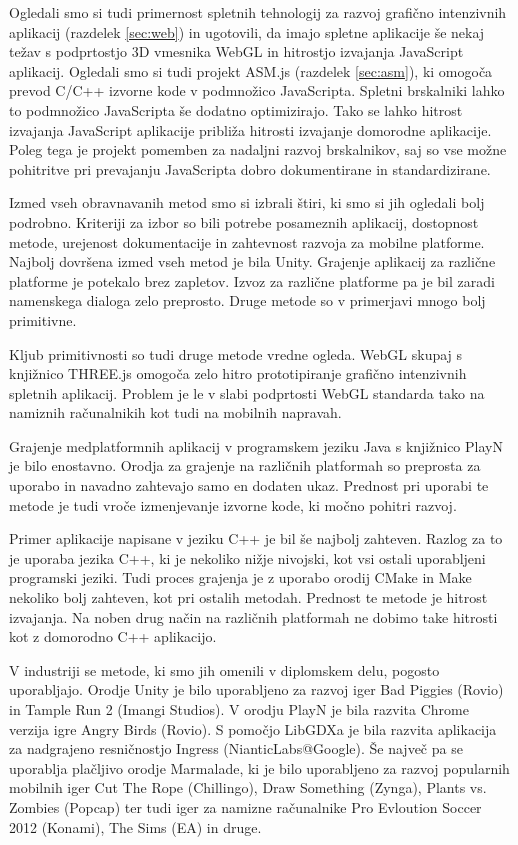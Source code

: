 Ogledali smo si tudi primernost spletnih tehnologij za razvoj grafično intenzivnih aplikacij (razdelek \ref{sec:web}) in ugotovili, da imajo spletne aplikacije še nekaj težav s podprtostjo 3D vmesnika WebGL in hitrostjo izvajanja JavaScript aplikacij. Ogledali smo si tudi projekt ASM.js (razdelek \ref{sec:asm}), ki omogoča prevod C/C++ izvorne kode v podmnožico JavaScripta. Spletni brskalniki lahko to podmnožico JavaScripta še dodatno optimizirajo. Tako se lahko hitrost izvajanja JavaScript aplikacije približa hitrosti izvajanje domorodne aplikacije. Poleg tega je projekt pomemben za nadaljni razvoj brskalnikov, saj so vse možne pohitritve pri prevajanju JavaScripta dobro dokumentirane in standardizirane.

Izmed vseh obravnavanih metod smo si izbrali štiri, ki smo si jih ogledali bolj podrobno. Kriteriji za izbor so bili potrebe posameznih aplikacij, dostopnost metode, urejenost dokumentacije in zahtevnost razvoja za mobilne platforme. Najbolj dovršena izmed vseh metod je bila Unity. Grajenje aplikacij za različne platforme je potekalo brez zapletov. Izvoz za različne platforme pa je bil zaradi namenskega dialoga zelo preprosto. Druge metode so v primerjavi mnogo bolj primitivne.

Kljub primitivnosti so tudi druge metode vredne ogleda. WebGL skupaj s knjižnico THREE.js omogoča zelo hitro prototipiranje grafično intenzivnih spletnih aplikacij. Problem je le v slabi podprtosti WebGL standarda tako na namiznih računalnikih kot tudi na mobilnih napravah.

Grajenje medplatformnih aplikacij v programskem jeziku Java s knjižnico PlayN je bilo enostavno. Orodja za grajenje na različnih platformah so preprosta za uporabo in navadno zahtevajo samo en dodaten ukaz. Prednost pri uporabi te metode je tudi vroče izmenjevanje izvorne kode, ki močno pohitri razvoj. 

Primer aplikacije napisane v jeziku C++ je bil še najbolj zahteven. Razlog za to je uporaba jezika C++, ki je nekoliko nižje nivojski, kot vsi ostali uporabljeni programski jeziki. Tudi proces grajenja je z uporabo orodij CMake in Make nekoliko bolj zahteven, kot pri ostalih metodah. Prednost te metode je hitrost izvajanja. Na noben drug način na različnih platformah ne dobimo take hitrosti kot z domorodno C++ aplikacijo.

V industriji se metode, ki smo jih omenili v diplomskem delu, pogosto uporabljajo. Orodje Unity je bilo uporabljeno za razvoj iger Bad Piggies (Rovio) in Tample Run 2 (Imangi Studios). V orodju PlayN je bila razvita Chrome verzija igre Angry Birds (Rovio). S pomočjo LibGDXa je bila razvita aplikacija za nadgrajeno resničnostjo Ingress (NianticLabs@Google). Še največ pa se uporablja plačljivo orodje Marmalade, ki je bilo uporabljeno za razvoj popularnih mobilnih iger Cut The Rope (Chillingo), Draw Something (Zynga), Plants vs. Zombies (Popcap) ter tudi iger za namizne računalnike Pro Evloution Soccer 2012 (Konami), The Sims (EA) in druge.


